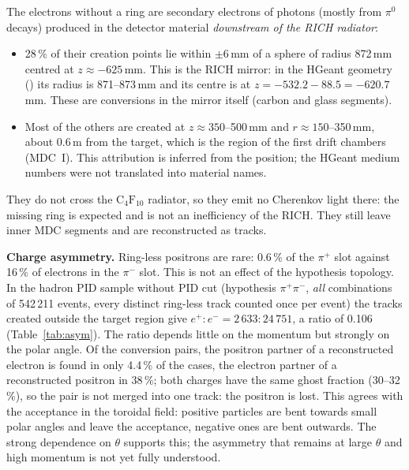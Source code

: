 \documentclass[11pt,a4paper]{article}
\newcommand{\pip}{\ensuremath{\pi^{+}}\xspace}
\newcommand{\pim}{\ensuremath{\pi^{-}}\xspace}
\newcommand{\piz}{\ensuremath{\pi^{0}}\xspace}
\newcommand{\code}[1]{\texttt{\detokenize{#1}}}
\newcommand{\chem}[1]{\ensuremath{\mathrm{#1}}}
\begin{document}
The electrons without a ring are secondary electrons of photons (mostly from \piz decays) produced
in the detector material \emph{downstream of the RICH radiator}:
\begin{itemize}
\item 28\,\% of their creation points lie within $\pm6$\,mm of a sphere of radius 872\,mm centred at
      $z\approx-625$\,mm. This is the RICH mirror: in the HGeant geometry (\code{rich.geo}) its radius is
      871--873\,mm and its centre is at $z = -532.2 - 88.5 = -620.7$\,mm. These are conversions in the
      mirror itself (carbon and glass segments).
\item Most of the others are created at $z\approx350$--500\,mm and $r\approx150$--350\,mm, about 0.6\,m
      from the target, which is the region of the first drift chambers (MDC~I). This attribution is
      inferred from the position; the HGeant medium numbers were not translated into material names.
\end{itemize}
They do not cross the \chem{C_4F_{10}} radiator, so they emit no Cherenkov light there: the missing
ring is expected and is not an inefficiency of the RICH. They still leave inner MDC segments and are
reconstructed as tracks.

\textbf{Charge asymmetry.} Ring-less positrons are rare: 0.6\,\% of the \pip slot against 16\,\% of
electrons in the \pim slot. This is not an effect of the hypothesis topology. In the hadron PID
sample without PID cut (hypothesis \pip\pim, \emph{all} combinations of 542\,211 events, every
distinct ring-less track counted once per event) the tracks created outside the target region give
$e^+ : e^- = 2\,633 : 24\,751$, a ratio of 0.106 (Table~\ref{tab:asym}). The ratio depends little on
the momentum but strongly on the polar angle. Of the conversion pairs, the positron partner of a
reconstructed electron is found in only 4.4\,\% of the cases, the electron partner of a reconstructed
positron in 38\,\%; both charges have the same ghost fraction (30--32\,\%), so the pair is not merged
into one track: the positron is lost. This agrees with the acceptance in the toroidal field: positive
particles are bent towards small polar angles and leave the acceptance, negative ones are bent
outwards. The strong dependence on $\theta$ supports this; the asymmetry that remains at large
$\theta$ and high momentum is not yet fully understood.
\end{document}
